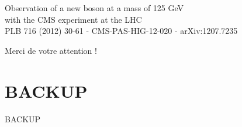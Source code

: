 \documentclass[usenames,dvipsnames]{beamer}
\begin{document}
\begin{frame}
\vspace{-.5cm}
\begin{center}
Observation of a new boson at a mass of 125 GeV\\with the CMS experiment at the LHC
\\\tiny
PLB 716 (2012) 30-61 - CMS-PAS-HIG-12-020 - arXiv:1207.7235
\end{center}
\vspace{-.8cm}
\begin{center}
Merci de votre attention !
\end{center}
\end{frame}

\appendix
\section{BACKUP}
\begin{frame}
\begin{center}
\LARGE
BACKUP
\end{center}
\end{frame}

\begin{frame}
\tableofcontents
\end{frame}
\end{document}
